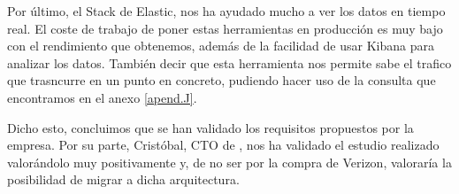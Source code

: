 Por último, el Stack de Elastic, nos ha ayudado mucho a ver los datos en tiempo real. El coste de trabajo de poner estas herramientas en producción es muy bajo con el rendimiento que obtenemos, además de la facilidad de usar Kibana para analizar los datos. También decir que esta herramienta nos permite sabe el trafico que trasncurre en un punto en concreto, pudiendo hacer uso de la consulta que encontramos en el anexo \ref{apend.J}. \par

Dicho esto, concluimos que se han validado los requisitos propuestos
por la empresa. Por su parte, Cristóbal, CTO de \mdata{}, nos ha
validado el estudio realizado valorándolo muy positivamente y, de no
ser por la compra de Verizon, valoraría la posibilidad de migrar a
dicha arquitectura.

